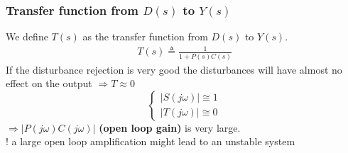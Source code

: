 \begin{frame}
	\frametitle{Transfer function from $D(s)$ to $Y(s)$}
	We define $T(s)$ as the transfer function from $D(s)$ to $Y(s)$.
	\begin{align*}
	T(s) \triangleq \frac{1}{1 + P(s)C(s)}
	\end{align*}
	If the disturbance rejection is very good the disturbances will have almost no effect on the output $\Rightarrow T \approx 0$ \\
	
	\[
	\begin{cases}
		\left| S(j\omega) \right| \cong 1 \\
		\left| T(j\omega) \right| \cong 0
	\end{cases}
	\]
	$\Rightarrow  \left| P(j\omega)C(j\omega) \right|$ \textbf{(open loop gain)} is very large. \\
	
	! a large open loop amplification might lead to an unstable system
	
\end{frame}

